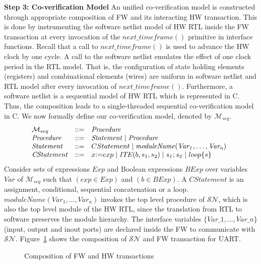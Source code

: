 \documentclass[sigconf]{acmart}
\begin{document}
\textbf{Step 3: Co-verification Model}
%
An unified co-verification model is constructed through appropriate composition of 
FW and its interacting HW transaction.  This is done by instrumenting the 
software netlist model of HW RTL inside the FW transaction at every invocation 
of the $next\_timeframe()$ primitive in interface functions.  Recall that a
call to $next\_timeframe()$ is used to advance the HW clock by one cycle.  A call
to the software netlist emulates the effect of one clock period in the RTL 
model. That is, the configuration of state holding elements (registers) and combinational 
elements (wires) are uniform in software netlist and RTL model after every invocation of 
$next\_timeframe()$.  Furthermore, a software
netlist is a sequential model of HW RTL which is represented in C.  Thus, the
composition leads to a single-threaded sequential co-verification model in C.  
%
We now formally define our co-verification model, denoted by 
$\mathcal{M}_{seq}$.
%
\[ 
\begin{array}[t]{@{}lll}
  \mathcal{M}_{seq} & {:}{:}{=} & \mathit{Procedure} \\
\mathit{Procedure} & {:}{:}{=} & \mathit{Statement} \mid \mathit{Procedure} \\
\mathit{Statement} & {:}{:}{=} & CStatement \mid \mathit{moduleName(Var_1,\dots,Var_n)} \\
\mathit{CStatement} & {:}{:}{=} & x {:}{=} exp \mid \mathit{ITE}(b, s_1,s_2) \mid \mathit{s_1;s_2} \mid loop\{s\} \\ 
\end{array}
\]
%
Consider sets of expressions $Exp$ and Boolean expressions $BExp$ 
over variables $Var$ of $\mathcal{M}_{seq}$ such that $(exp \in Exp)$ and 
$(b \in BExp)$. A $\mathit{CStatement}$ is an assignment,
conditional, sequential concatenation or a loop.
$\mathit{moduleName(Var_1,\dots,Var_n)}$ invokes the top level 
procedure of $\mathcal{SN}$, which is also the top level 
module of the HW RTL, since the translation from RTL to software preserves
the module hierarchy.  The interface variables $\{Var\_1,\dots,Var\_n\}$ 
(input, output and inout ports) are declared inside the 
FW to communicate with $\mathcal{SN}$.  Figure~\ref{compose} shows the 
composition of $\mathcal{SN}$ and FW transaction for UART.
%
\begin{figure}[t]
  \caption{Composition of FW and HW transactions}
\label{compose}
\end{figure}
\end{document}
